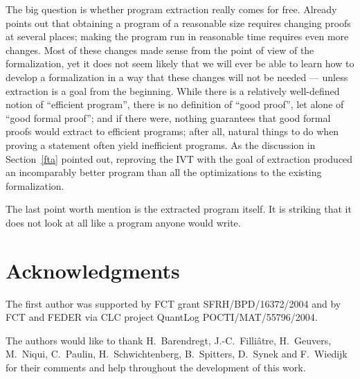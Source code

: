 \documentclass{entcs}
\begin{document}
The big question is whether program extraction really comes
for free.  Already~\cite{lcf:spi:03} points out that obtaining a
program of a reasonable size requires changing proofs at several places;
making the program run in reasonable time requires even more changes.
Most of these changes made sense from the point of view of the
formalization, yet it does not seem likely that we will ever be able to
learn how to develop a formalization in a way that these changes will not be
needed --- unless extraction is a goal from the beginning.
While there is a relatively well-defined
notion of ``efficient program'', there is no
definition of ``good proof'', let alone of ``good formal proof''; and if
there were, nothing guarantees that good formal proofs would extract to
efficient programs;
after all, natural things to do when proving a statement
often yield inefficient programs.
As the discussion in Section~\ref{fta} pointed out, reproving the IVT
with the goal of extraction produced an incomparably better program than
all the optimizations to the existing formalization.

The last point worth mention is the extracted program itself.  It is
striking that it does not look at all like a program anyone would write.


\section*{Acknowledgments}

The first author was supported
by FCT grant SFRH/BPD/16372/2004
and by FCT and FEDER via CLC project QuantLog
POCTI/MAT/55796/2004.

The authors would like to thank H.~Barendregt, J.-C.~Filli{\^a}tre,
H.~Geuvers, M.~Niqui, C.~Paulin, H.~Schwichtenberg, B.~Spitters, D.~Synek
and F.~Wiedijk for their
comments and help throughout the development of this work.



\end{document}
